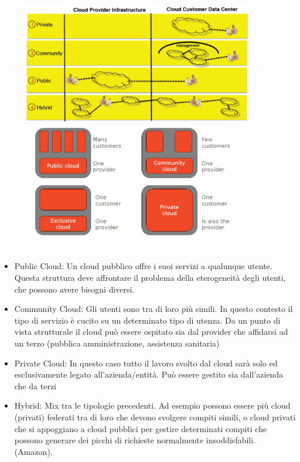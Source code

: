 \documentclass{article}
\begin{document}
		\begin{figure}[ht]
		    \centering
		    \begin{minipage}{0.45\textwidth}
		        \centering
		        \includegraphics[width=0.9\textwidth]{SAC_06.png} %
		    \end{minipage}\hfill
		    \begin{minipage}{0.45\textwidth}
		        \centering
		        \includegraphics[width=0.9\textwidth]{SAC_07.png} %
		    \end{minipage}
		\end{figure}
		
		\begin{itemize}
		    \item Public Cloud: Un cloud pubblico offre i suoi servizi a qualunque utente. Questa struttura deve affrontare il problema della eterogeneità degli utenti, che possono avere bisogni diversi.
		    \item Community Cloud: Gli utenti sono tra di loro più simili. In questo contesto il tipo di servizio è cucito su un determinato tipo di utenza. Da un punto di vista strutturale il cloud può essere ospitato sia dal provider che affidarsi ad un terzo (pubblica amministrazione, assistenza sanitaria)
		    \item Private Cloud: In questo caso tutto il lavoro svolto dal cloud sarà solo ed esclusivamente legato all'azienda/entità.
		    Può essere gestito sia dall'azienda che da terzi
		    \item Hybrid: Mix tra le tipologie precedenti. Ad esempio possono essere più cloud (privati) federati tra di loro che devono svolgere compiti simili, o cloud privati che si appoggiano a cloud pubblici per gestire determinati compiti che possono generare dei picchi di richieste normalmente insoddisfabili. (Amazon).
		\end{itemize}
		
\end{document}
